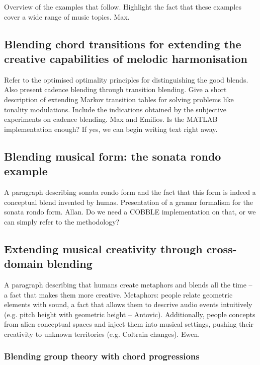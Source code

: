 \documentclass[10pt,twoside,a4paper]{article}
\newcommand\comment[1]{{\color{red}#1}}
\begin{document}
Overview of the examples that follow. Highlight the fact that these examples cover a wide range of music topics. \comment{Max.}

\subsection{Blending chord transitions for extending the creative capabilities of melodic harmonisation}

Refer to the optimised optimality principles for distinguishing the good blends. Also present cadence blending through transition blending. Give a short description of extending Markov transition tables for solving problems like tonality modulations. Include the indications obtained by the subjective experiments on cadence blending. \comment{Max and Emilios. Is the MATLAB implementation enough? If yes, we can begin writing text right away.}

\subsection{Blending musical form: the sonata rondo example}

A paragraph describing sonata rondo form and the fact that this form is indeed a conceptual blend invented by humas. Presentation of a gramar formalism for the sonata rondo form. \comment{Allan. Do we need a COBBLE implementation on that, or we can simply refer to the methodology?}

\subsection{Extending musical creativity through cross-domain blending}

A paragraph describing that humans create metaphors and blends all the time -- a fact that makes them more creative. Metaphors: people relate geometric elements with sound, a fact that allows them to descrive audio events intuitively (e.g. pitch height with geometric height -- Antovic). Additionally, people concepts from alien conceptual spaces and inject them into musical settings, pushing their creativity to unknown territories (e.g. Coltrain changes). \comment{Ewen.}

\subsubsection{Blending group theory with chord progressions}
\end{document}
